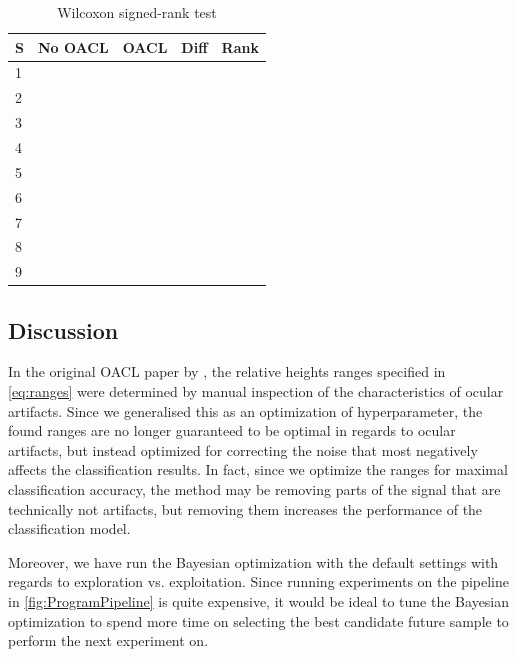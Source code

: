 \begin{table}[H]
	\centering
	\caption{Wilcoxon signed-rank test}
	\label{fig:wilcoxon}
	\begin{tabular}{@{}l|llll@{}}
		\toprule
		S & No OACL & OACL & Diff & Rank \\ \midrule
		1 &               &                 &      &      \\
		2 &               &                 &      &      \\
		3 &               &                 &      &      \\
		4 &               &                 &      &      \\
		5 &               &                 &      &      \\
		6 &               &                 &      &      \\
		7 &               &                 &      &      \\
		8 &               &                 &      &      \\
		9 &               &                 &      &      \\ \bottomrule
	\end{tabular}
\end{table}

\subsection{Discussion}\label{sec:discussion}
In the original OACL paper by \citep{li2015ocular}, the relative heights ranges specified in \cref{eq:ranges} were determined by manual inspection of the characteristics of ocular artifacts. Since we generalised this as an optimization of hyperparameter, the found ranges are no longer guaranteed to be optimal in regards to ocular artifacts, but instead optimized for correcting the noise that most negatively affects the classification results. In fact, since we optimize the ranges for maximal classification accuracy, the method may be removing parts of the signal that are technically not artifacts, but removing them increases the performance of the classification model.

Moreover, we have run the Bayesian optimization with the default settings with regards to exploration vs. exploitation. Since running experiments on the pipeline in \cref{fig:ProgramPipeline} is quite expensive, it would be ideal to tune the Bayesian optimization to spend more time on selecting the best candidate future sample to perform the next experiment on.
